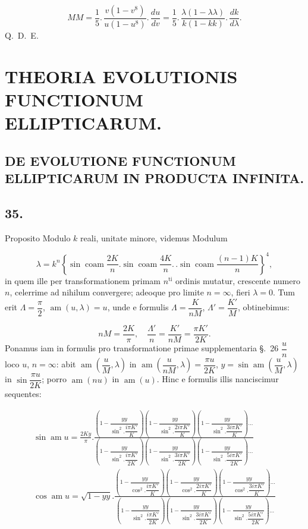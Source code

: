 \documentclass{article}
\begin{document}
\[
MM=\frac{1}{5}.\,\frac{v(1-v^{8})}{u(1-u^{8})}.\,\frac{du}{dv}=\frac{1}{5}.\,\frac{\lambda(1-\lambda\lambda)}{k(1-kk)}.\,\frac{dk}{d\lambda}.
\]
Q.\ D.\ E.


\section*{THEORIA EVOLUTIONIS FUNCTIONUM ELLIPTICARUM.}

\subsection*{DE EVOLUTIONE FUNCTIONUM ELLIPTICARUM IN PRODUCTA INFINITA.}

\subsection*{35.}

Proposito Modulo $k$ reali, unitate minore, videmus Modulum

\[
\lambda=k^{n}\left\{\sin\operatorname{coam}\frac{2K}{n}.\sin\operatorname{coam}\frac{4K}{n}.\,.\sin\operatorname{coam}\frac{(n-1)K}{n}\right\}^{4},
\]
in quem ille per transformationem primam $n^{\mathrm{ti}}$ ordinis mutatur, crescente numero $n$, celerrime ad nihilum convergere; adeoque pro limite $n=\infty$, fieri $\lambda=0$. Tum erit $\Lambda=\dfrac{\pi}{2}$, $\operatorname{am}(u,\lambda)=u$, unde e formulis $\Lambda=\dfrac{K}{nM}$, $\Lambda'=\dfrac{K'}{M}$, obtinebimus:

\[
nM=\frac{2K}{\pi},\quad\frac{\Lambda'}{n}=\frac{K'}{nM}=\frac{\pi K'}{2K}.
\]
Ponamus iam in formulis pro transformatione primae supplementaria §.\ 26 $\dfrac{u}{n}$ loco $u$, $n=\infty$: abit $\operatorname{am}\left(\dfrac{u}{M},\lambda\right)$ in $\operatorname{am}\left(\dfrac{u}{nM},\lambda\right)=\dfrac{\pi u}{2K}$, $y=\sin\operatorname{am}\left(\dfrac{u}{M},\lambda\right)$ in $\sin\dfrac{\pi u}{2K}$; porro $\operatorname{am}(nu)$ in $\operatorname{am}(u)$. Hinc e formulis illis nanciscimur sequentes:

\[
\begin{gathered}
\sin\operatorname{am}u=\frac{2Ky}{\pi}.\frac{\left(1-\dfrac{yy}{\sin^{2}.\dfrac{i\pi K'}{K}}\right)\left(1-\dfrac{yy}{\sin^{2}.\dfrac{2i\pi K'}{K}}\right)\left(1-\dfrac{yy}{\sin^{2}.\dfrac{3i\pi K'}{K}}\right)\ldots}{\left(1-\dfrac{yy}{\sin^{2}.\dfrac{i\pi K'}{2K}}\right)\left(1-\dfrac{yy}{\sin^{2}.\dfrac{3i\pi K'}{2K}}\right)\left(1-\dfrac{yy}{\sin^{2}.\dfrac{5i\pi K'}{2K}}\right)\ldots}\\[3ex]
\cos\operatorname{am}u=\sqrt{1-yy}.\frac{\left(1-\dfrac{yy}{\cos^{2}.\dfrac{i\pi K'}{K}}\right)\left(1-\dfrac{yy}{\cos^{2}.\dfrac{2i\pi K'}{K}}\right)\left(1-\dfrac{yy}{\cos^{2}.\dfrac{3i\pi K'}{K}}\right)\ldots}{\left(1-\dfrac{yy}{\sin^{2}.\dfrac{i\pi K'}{2K}}\right)\left(1-\dfrac{yy}{\sin^{2}.\dfrac{3i\pi K'}{2K}}\right)\left(1-\dfrac{yy}{\sin^{2}.\dfrac{5i\pi K'}{2K}}\right)\ldots}
\end{gathered}
\]
\end{document}
